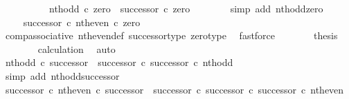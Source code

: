 \begin{isabellebody}
\ \ \isamarkupfalse%
\ {\isacharminus}{\kern0pt}\isanewline
\ \ \ \ \isamarkupfalse%
\ {\isachardoublequoteopen}nth{\isacharunderscore}{\kern0pt}odd\ {\isasymcirc}\isactrlsub c\ zero\ {\isacharequal}{\kern0pt}\ successor\ {\isasymcirc}\isactrlsub c\ zero{\isachardoublequoteclose}\isanewline
\ \ \ \ \ \ \isamarkupfalse%
\ {\isacharparenleft}{\kern0pt}simp\ add{\isacharcolon}{\kern0pt}\ nth{\isacharunderscore}{\kern0pt}odd{\isacharunderscore}{\kern0pt}zero{\isacharparenright}{\kern0pt}\isanewline
\ \ \ \ \isamarkupfalse%
\ \isamarkupfalse%
\ {\isachardoublequoteopen}{\isachardot}{\kern0pt}{\isachardot}{\kern0pt}{\isachardot}{\kern0pt}\ {\isacharequal}{\kern0pt}\ {\isacharparenleft}{\kern0pt}successor\ {\isasymcirc}\isactrlsub c\ nth{\isacharunderscore}{\kern0pt}even{\isacharparenright}{\kern0pt}\ {\isasymcirc}\isactrlsub c\ zero{\isachardoublequoteclose}\isanewline
\ \ \ \ \ \ \isamarkupfalse%
\ comp{\isacharunderscore}{\kern0pt}associative{}\ nth{\isacharunderscore}{\kern0pt}even{\isacharunderscore}{\kern0pt}def{}\ successor{\isacharunderscore}{\kern0pt}type\ zero{\isacharunderscore}{\kern0pt}type\ \isamarkupfalse%
\ fastforce\isanewline
\ \ \ \ \isamarkupfalse%
\ \isamarkupfalse%
\ {\isacharquery}{\kern0pt}thesis\isanewline
\ \ \ \ \ \ \isamarkupfalse%
\ calculation\ \isamarkupfalse%
\ auto\isanewline
\ \ \isamarkupfalse%
\isanewline
\isanewline
\ \ \isamarkupfalse%
\ {\isachardoublequoteopen}nth{\isacharunderscore}{\kern0pt}odd\ {\isasymcirc}\isactrlsub c\ successor\ {\isacharequal}{\kern0pt}\ {\isacharparenleft}{\kern0pt}successor\ {\isasymcirc}\isactrlsub c\ successor{\isacharparenright}{\kern0pt}\ {\isasymcirc}\isactrlsub c\ nth{\isacharunderscore}{\kern0pt}odd{\isachardoublequoteclose}\isanewline
\ \ \ \ \isamarkupfalse%
\ {\isacharparenleft}{\kern0pt}simp\ add{\isacharcolon}{\kern0pt}\ nth{\isacharunderscore}{\kern0pt}odd{\isacharunderscore}{\kern0pt}successor{\isacharparenright}{\kern0pt}\isanewline
\isanewline
\ \ \isamarkupfalse%
\ {\isachardoublequoteopen}{\isacharparenleft}{\kern0pt}successor\ {\isasymcirc}\isactrlsub c\ nth{\isacharunderscore}{\kern0pt}even{\isacharparenright}{\kern0pt}\ {\isasymcirc}\isactrlsub c\ successor\ {\isacharequal}{\kern0pt}\ {\isacharparenleft}{\kern0pt}successor\ {\isasymcirc}\isactrlsub c\ successor{\isacharparenright}{\kern0pt}\ {\isasymcirc}\isactrlsub c\ successor\ {\isasymcirc}\isactrlsub c\ nth{\isacharunderscore}{\kern0pt}even{\isachardoublequoteclose}\isanewline

\end{isabellebody}
